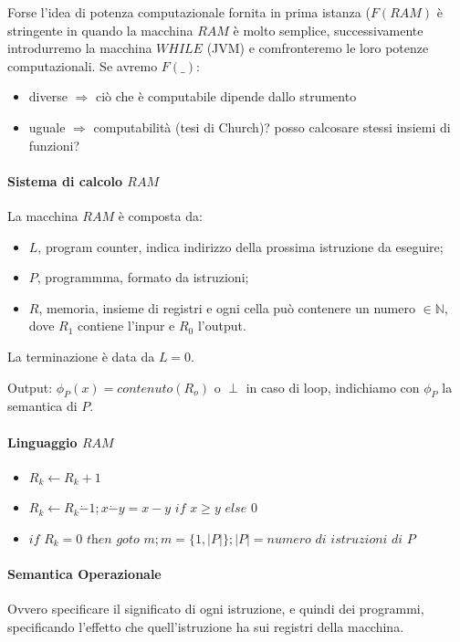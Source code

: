 \documentclass{article}
\begin{document}
Forse l'idea di potenza computazionale fornita in prima istanza ($F(\textit{RAM})$ è stringente in quando la macchina $\textit{RAM}$ è molto semplice, successivamente introdurremo la macchina $\textit{WHILE}$ (JVM) e comfronteremo le loro potenze computazionali. Se avremo $F(\_)$:
\begin{itemize}
	\item diverse $\Rightarrow$ ciò che è computabile dipende dallo strumento
	\item uguale $\Rightarrow$ computabilità (tesi di Church)? posso calcosare stessi insiemi di funzioni?
\end{itemize}

\paragraph{Sistema di calcolo $\textit{RAM}$}
La macchina $\textit{RAM}$ è composta da:
\begin{itemize}
	\item $L$, program counter, indica indirizzo della prossima istruzione da eseguire;
	\item $P$, programmma, formato da istruzioni;
	\item $R$, memoria, insieme di registri e ogni cella può contenere un numero $\in \mathbb{N}$, dove $R_1$ contiene l'inpur e $R_0$ l'output.
\end{itemize}



La terminazione è data da $L=0$. 



Output: $\phi_P(x)=\textit{contenuto}(R_o)$ o $\perp$ in caso di loop, indichiamo con $\phi_P$ la semantica di $P$.

\paragraph{Linguaggio $\textit{RAM}$}
\begin{itemize}
	\item $R_k \leftarrow R_{k} + 1 $
	\item $R_k \leftarrow R_{k} \dot{-} 1; x \dot{-} y = x-y \textit{ if } x \geq y \textit{ else } 0$
	\item $\textit{if } R_k=0 \textit{ then goto } m; m=\{1, |P| \}; |P|=\textit{numero di istruzioni di } P $
\end{itemize}

\paragraph{Semantica Operazionale}
Ovvero specificare il significato di ogni istruzione, e quindi dei programmi, specificando l'effetto che quell'istruzione ha sui registri della macchina.
\end{document}
